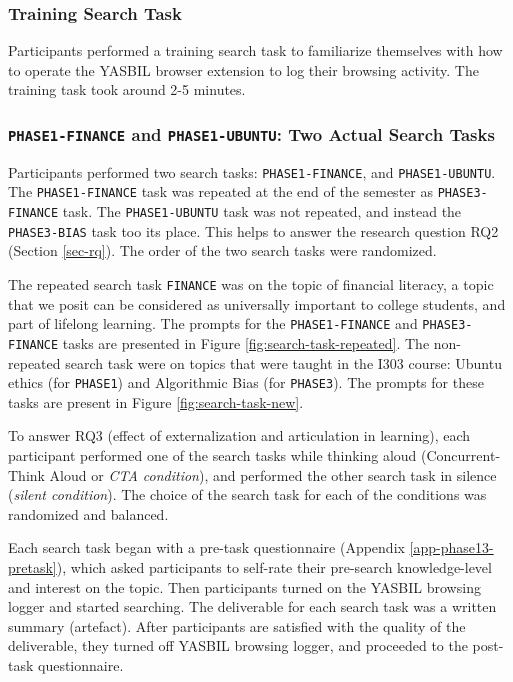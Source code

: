 \documentclass[letterpaper, nobind]{templates/ociamthesis}
\begin{document}
\hypertarget{training-search-task}{%
\subsubsection{Training Search Task}\label{training-search-task}}

Participants performed a training search task to familiarize themselves with how to operate the YASBIL browser extension to log their browsing activity. The training task took around 2-5 minutes.

\hypertarget{phase1-finance-and-phase1-ubuntu-two-actual-search-tasks}{%
\subsubsection{\texorpdfstring{\texttt{PHASE1-FINANCE} and \texttt{PHASE1-UBUNTU}: Two Actual Search Tasks}{PHASE1-FINANCE and PHASE1-UBUNTU: Two Actual Search Tasks}}\label{phase1-finance-and-phase1-ubuntu-two-actual-search-tasks}}

Participants performed two search tasks: \texttt{PHASE1-FINANCE}, and \texttt{PHASE1-UBUNTU}.
The \texttt{PHASE1-FINANCE} task was repeated at the end of the semester as \texttt{PHASE3-FINANCE} task.
The \texttt{PHASE1-UBUNTU} task was not repeated, and instead the \texttt{PHASE3-BIAS} task too its place.
This helps to answer the research question RQ2 (Section \ref{sec-rq}).
The order of the two search tasks were randomized.

The repeated search task \texttt{FINANCE} was on the topic of financial literacy, a topic that we posit can be considered as universally important to college students, and part of lifelong learning.
The prompts for the \texttt{PHASE1-FINANCE} and \texttt{PHASE3-FINANCE} tasks are presented in Figure \ref{fig:search-task-repeated}.
The non-repeated search task were on topics that were taught in the I303 course:
Ubuntu ethics (for \texttt{PHASE1})
and
Algorithmic Bias (for \texttt{PHASE3}).
The prompts for these tasks are present in Figure \ref{fig:search-task-new}.

To answer RQ3 (effect of externalization and articulation in learning), each participant performed one of the search tasks while thinking aloud (Concurrent-Think Aloud or \emph{CTA condition}), and performed the other search task in silence (\emph{silent condition}).
The choice of the search task for each of the conditions was randomized and balanced.

Each search task began with a pre-task questionnaire (Appendix \ref{app-phase13-pretask}), which asked participants to self-rate their pre-search knowledge-level and interest on the topic.
Then participants turned on the YASBIL browsing logger and started searching.
The deliverable for each search task was a written summary (artefact).
After participants are satisfied with the quality of the deliverable, they turned off YASBIL browsing logger, and proceeded to the post-task questionnaire.
\end{document}
